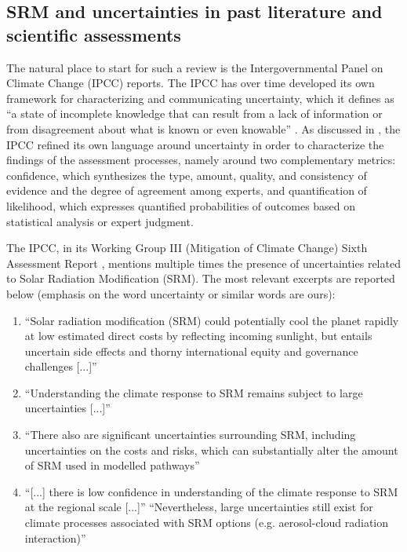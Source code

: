 \documentclass[acp, manuscript]{copernicus}
\begin{document}
\subsection{SRM and uncertainties in past literature and scientific assessments}

The natural place to start for such a review is the Intergovernmental Panel on Climate Change (IPCC) reports. The IPCC has over time developed its own framework for characterizing and communicating uncertainty, which it defines as ``a state of incomplete knowledge that can result from a lack of information or from disagreement about what is known or even knowable'' \citep{IPCC_2013_WGI_SPM}. As discussed in \cite{mastrandrea2011ipcc}, the IPCC refined its own language around uncertainty in order to characterize the findings of the assessment processes, namely around two complementary metrics: confidence, which synthesizes the type, amount, quality, and consistency of evidence and the degree of agreement among experts, and quantification of likelihood, which expresses quantified probabilities of outcomes based on statistical analysis or expert judgment.

The IPCC, in its Working Group III (Mitigation of Climate Change) Sixth Assessment Report \citep{IPCC_2022_WGIII}, mentions multiple times the presence of uncertainties related to Solar Radiation Modification (SRM). The most relevant excerpts are reported below (emphasis on the word uncertainty or similar words are ours):

\begin{enumerate}
    \item ``Solar radiation modification (SRM) could potentially cool the planet rapidly at low estimated direct costs by reflecting incoming sunlight, but entails uncertain side effects and thorny international equity and governance challenges [...]''
    \item ``Understanding the climate response to SRM remains subject to large uncertainties [...]''
    \item ``There also are significant uncertainties surrounding SRM, including uncertainties on the costs and risks, which can substantially alter the amount of SRM used in modelled pathways''
    \item ``[...] there is low confidence in understanding of the climate response to SRM at the regional scale [...]” “Nevertheless, large uncertainties still exist for climate processes associated with SRM options (e.g. aerosol-cloud radiation interaction)''
\end{enumerate}
\end{document}
